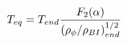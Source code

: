 \begin{equation}
T_{eq}= T_{end} {F_2(\alpha) \over {\left(\rho_{\phi}/\rho_{BI}\right)_{end}^{1/2}}} 
\label{Teq}
\end{equation}

